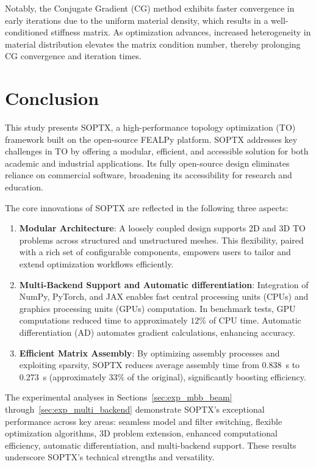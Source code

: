 \documentclass[mathpazo]{cicp}
\begin{document}
Notably, the Conjugate Gradient (CG) method exhibits faster convergence in early iterations due to the uniform material density, which results in a well-conditioned stiffness matrix. As optimization advances, increased heterogeneity in material distribution elevates the matrix condition number, thereby prolonging CG convergence and iteration times.

\section{Conclusion}
This study presents SOPTX, a high-performance topology optimization (TO) framework built on the open-source FEALPy platform. SOPTX addresses key challenges in TO by offering a modular, efficient, and accessible solution for both academic and industrial applications. Its fully open-source design eliminates reliance on commercial software, broadening its accessibility for research and education.

The core innovations of SOPTX are reflected in the following three aspects:
\begin{enumerate} 
	\item \textbf{Modular Architecture}: A loosely coupled design supports 2D and 3D TO problems across structured and unstructured meshes. This flexibility, paired with a rich set of configurable components, empowers users to tailor and extend optimization workflows efficiently.
	\item \textbf{Multi-Backend Support and Automatic differentiation}: Integration of NumPy, PyTorch, and JAX enables fast central processing units (CPUs) and graphics processing units (GPUs) computation. In benchmark tests, GPU computations reduced time to approximately $12\%$ of CPU time. Automatic differentiation (AD) automates gradient calculations, enhancing accuracy.
	\item \textbf{Efficient Matrix Assembly}: By optimizing assembly processes and exploiting sparsity, SOPTX reduces average assembly time from \SI{0.838}{s} to \SI{0.273}{s} (approximately $33\%$ of the original), significantly boosting efficiency.
\end{enumerate}

The experimental analyses in Sections~\ref{sec:exp_mbb_beam} through~\ref{sec:exp_multi_backend} demonstrate SOPTX's exceptional performance across key areas: seamless model and filter switching, flexible optimization algorithms, 3D problem extension, enhanced computational efficiency, automatic differentiation, and multi-backend support. These results underscore SOPTX's technical strengths and versatility.
\end{document}

